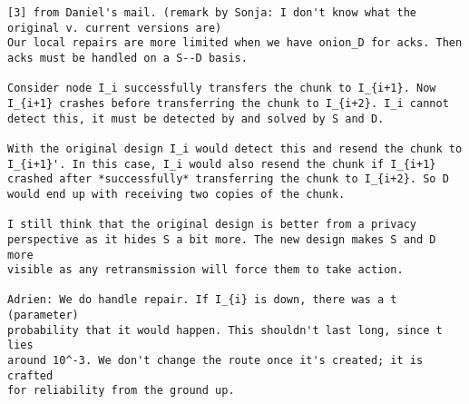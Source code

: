\begin{verbatim}
[3] from Daniel's mail. (remark by Sonja: I don't know what the original v. current versions are)
Our local repairs are more limited when we have onion_D for acks. Then 
acks must be handled on a S--D basis.

Consider node I_i successfully transfers the chunk to I_{i+1}. Now 
I_{i+1} crashes before transferring the chunk to I_{i+2}. I_i cannot 
detect this, it must be detected by and solved by S and D.

With the original design I_i would detect this and resend the chunk to 
I_{i+1}'. In this case, I_i would also resend the chunk if I_{i+1} 
crashed after *successfully* transferring the chunk to I_{i+2}. So D 
would end up with receiving two copies of the chunk.

I still think that the original design is better from a privacy 
perspective as it hides S a bit more. The new design makes S and D more 
visible as any retransmission will force them to take action.

Adrien: We do handle repair. If I_{i} is down, there was a t (parameter)
probability that it would happen. This shouldn't last long, since t lies
around 10^-3. We don't change the route once it's created; it is crafted
for reliability from the ground up.


\end{verbatim}